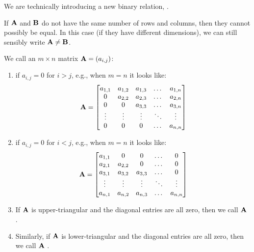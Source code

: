 \begin{remark}
We are technically introducing a new binary relation, .
\end{remark}

\begin{remark}
If $\mathbf{A}$ and $\mathbf{B}$ do not have the same number of rows and columns, then
they cannot possibly be equal. In this case (if they have different
dimensions), we can still sensibly write $\mathbf{A}\neq\mathbf{B}$.
\end{remark}

\begin{definition}\label{defn:matrix-zoo:triangular}
We call an $m\times n$ matrix $\mathbf{A}=(a_{i,j})$:
\begin{enumerate}
\item {} if $a_{i,j}=0$ for $i>j$, e.g., when
  $m=n$ it looks like:
  \[ \mathbf{A} = \begin{bmatrix}
    a_{1,1} & a_{1,2} & a_{1,3} & \dots & a_{1,n}\\
    0      & a_{2,2} & a_{2,3} & \dots & a_{2,n}\\
    0      & 0       & a_{3,3} & \dots & a_{3,n}\\
    \vdots & \vdots & \vdots & \ddots & \vdots\\
    0      & 0      & 0      & \dots  & a_{n,n}
  \end{bmatrix} \]
\item {} if $a_{i,j}=0$ for $i<j$, e.g., when
  $m=n$ it looks like:
  \[ \mathbf{A} = \begin{bmatrix}
    a_{1,1} & 0      & 0       & \dots & 0\\
    a_{2,1} & a_{2,2} & 0       & \dots & 0\\
    a_{3,1} & a_{3,2} & a_{3,3} & \dots & 0\\
    \vdots & \vdots & \vdots & \ddots & \vdots\\
    a_{n,1} & a_{n,2} & a_{n,3} & \dots  & a_{n,n}
  \end{bmatrix} \]
\item If $\mathbf{A}$ is upper-triangular and the diagonal entries are all zero,
  then we call $\mathbf{A}$ .
\item Similarly, if $\mathbf{A}$ is lower-triangular and the diagonal entries are
  all zero, then we call $\mathbf{A}$ .
\end{enumerate}
\end{definition}

